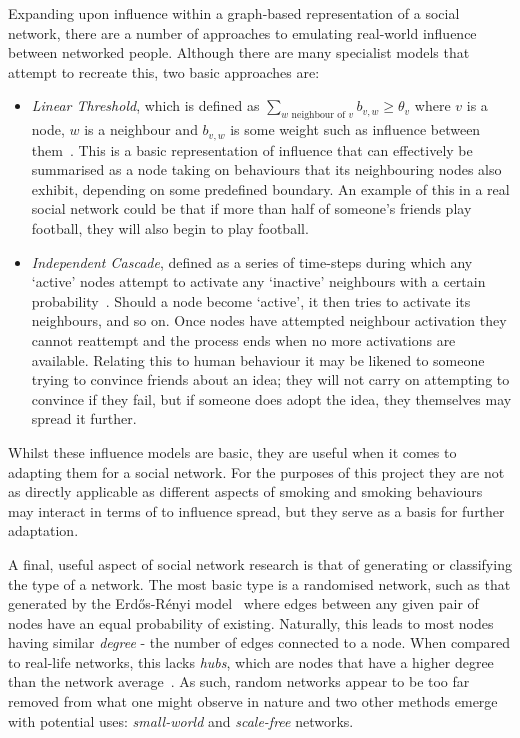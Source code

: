 \documentclass[]{report}
\begin{document}
Expanding upon influence within a graph-based representation of a social network, there are a number of approaches to emulating real-world influence between networked people. Although there are many specialist models that attempt to recreate this, two basic approaches are:
\begin{itemize}
\item \emph{Linear Threshold}, which is defined as $\sum\limits_{w \text{ neighbour of } v}^{} b_{v,w} \geq \theta_{v} $ where $v$ is a node, $w$ is a neighbour and $b_{v,w}$ is some weight such as influence between them~\cite{inf-papers}. This is a basic representation of influence that can effectively be summarised as a node taking on behaviours that its neighbouring nodes also exhibit, depending on some predefined boundary. An example of this in a real social network could be that if more than half of someone's friends play football, they will also begin to play football.
\item \emph{Independent Cascade}, defined as a series of time-steps during which any `active' nodes attempt to activate any `inactive' neighbours with a certain probability~\cite{inf-papers}. Should a node become `active', it then tries to activate its neighbours, and so on. Once nodes have attempted neighbour activation they cannot reattempt and the process ends when no more activations are available. Relating this to human behaviour it may be likened to someone trying to convince friends about an idea; they will not carry on attempting to convince if they fail, but if someone does adopt the idea, they themselves may spread it further.
\end{itemize}
Whilst these influence models are basic, they are useful when it comes to adapting them for a social network. For the purposes of this project they are not as directly applicable as different aspects of smoking and smoking behaviours may interact in terms of to influence spread, but they serve as a basis for further adaptation.


A final, useful aspect of social network research is that of generating or classifying the type of a network. The most basic type is a randomised network, such as that generated by the Erd\H{o}s-R\'{e}nyi model~\cite{erdos} where edges between any given pair of nodes have an equal probability of existing. Naturally, this leads to most nodes having similar \emph{degree} - the number of edges connected to a node. When compared to real-life networks, this lacks \emph{hubs}, which are nodes that have a higher degree than the network average~\cite{BA-SciAm}. As such, random networks appear to be too far removed from what one might observe in nature and two other methods emerge with potential uses: \emph{small-world} and \emph{scale-free} networks.
\end{document}
